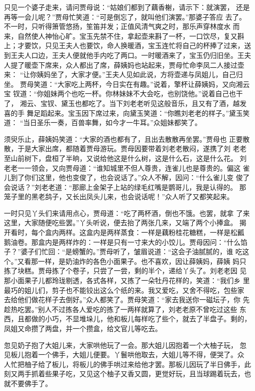 只见一个婆子走来，请问贾母说：“姑娘们都到了藕香榭，请示下：就演罢，
还是再等一会儿呢？”贾母忙笑道：“可是倒忘了，就叫他们演罢。”那婆子答应
去了。不一时，只听得箫管悠扬，笙笛并发；正值风清气爽之时，那乐声穿林度水
而来，自然使人神怡心旷。宝玉先禁不住，拿起壶来斟了一杯，一口饮尽，复又斟
上；才要饮，只见王夫人也要饮，命人换暖酒，宝玉连忙将自己的杯捧了过来，送
到王夫人口边，王夫人便就他手内吃了两口。一时暖酒来了，宝玉仍归旧坐。王夫
人提了暖壶下席来，众人都出了席，薛姨妈也站起来，贾母忙命李凤二人接过壶来：
“让你姨妈坐了，大家才便。”王夫人见如此说，方将壶递与凤姐儿，自己归坐。
贾母笑道：“大家吃上两杯，今日实在有趣。”说着，擎杯让薛姨妈，又向湘云宝
钗道：“你姐妹两个也吃一杯。你林妹妹不大会吃，也别饶他。”说着自己也干了，
湘云、宝钗、黛玉也都吃了。当下刘老老听见这般音乐，且又有了酒，越发喜的手
舞足蹈起来。宝玉因下席过来，向黛玉笑道：“你瞧刘老老的样子。”黛玉笑道：
“当日圣乐一奏，百兽率舞，如今才一牛耳。”众姐妹都笑了。

须臾乐止，薛姨妈笑道：“大家的酒也都有了，且出去散散再坐罢。”贾母也
正要散散，于是大家出席，都随着贾母游玩。贾母因要带着刘老老散闷，遂携了刘
老老至山前树下，盘桓了半晌，又说给他这是什么树，这是什么石，这是什么花。
刘老老一一领会，又向贾母道：“谁知城里不但人尊贵，连雀儿也是尊贵的。偏这
雀儿到了你们这里，他也变俊了，也会说话了。”众人不解，因问：“什么雀儿变
俊了会说话？”刘老老道：“那廊上金架子上站的绿毛红嘴是鹦哥儿，我是认得的。
那笼子里的黑老鸹子，又长出凤头儿来，也会说话呢！”众人听了又都笑起来。

一时只见丫头们来请用点心，贾母道：“吃了两杯酒，倒也不饿。也罢，就拿
了来这里，大家随便吃些罢。”丫头听说，便去抬了两张几来，又端了两个小捧盒。
揭开看时，每个盒内两样。这盒内是两样蒸食：一样是藕粉桂花糖糕，一样是松瓤
鹅油卷。那盒内是两样炸的：一样是只有一寸来大的小饺儿。贾母因问：“什么馅
子？”婆子们忙回：“是螃蟹的。”贾母听了，皱眉说道：“这会子油腻腻的，谁
吃这个。”又看那一样，是奶油炸的各色小面果子。也不喜欢，因让薛姨妈，薛姨
妈只拣了块糕。贾母拣了个卷子，只尝了一尝，剩的半个，递给丫头了。刘老老因
见那小面果子儿都玲珑剔透，各式各样，又拣了一朵牡丹花样的，笑道：“我们乡
里最巧的姐儿们，剪子也不能铰出这么个纸的来。我又爱吃，又舍不得吃，包些家
去给他们做花样子去倒好。”众人都笑了。贾母笑道：“家去我送你一磁坛子，你
先趁热吃罢。”别人不过拣各人爱吃的拣了一两样就算了，刘老老原不曾吃过这些
东西，且都做的小巧，不显堆垛儿，他和板儿每样吃了些个，就去了半盘子。剩的，
凤姐又命攒了两盘，并一个攒盒，给文官儿等吃去。

忽见奶子抱了大姐儿来，大家哄他玩了一会。那大姐儿因抱着一个大柚子玩，
忽见板儿抱着一个佛手，大姐儿便要。丫鬟哄他取去，大姐儿等不得，便哭了。众
人忙把柚子给了板儿，将板儿的佛手哄过来给他才罢。那板儿因玩了半日佛手，此
刻又两手抓着些果子吃，又见这个柚子又香又圆，更觉好玩，且当球踢着玩去，也
就不要佛手了。

